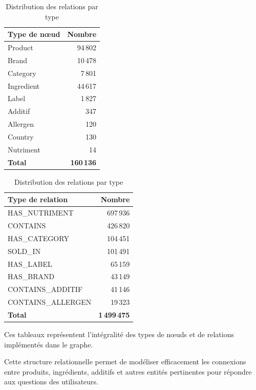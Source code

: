 \documentclass[a4paper,11pt]{article}
\begin{document}
\begin{table}[H]
\begin{minipage}[b]{0.45\linewidth}
\centering
\begin{tabular}{lr}
\toprule
\textbf{Type de nœud} & \textbf{Nombre} \\
\midrule
Product & 94\,802 \\
Brand & 10\,478 \\
Category & 7\,801 \\
Ingredient & 44\,617 \\
Label & 1\,827 \\
Additif & 347 \\
Allergen & 120 \\
Country & 130 \\
Nutriment & 14 \\
\midrule
\textbf{Total} & \textbf{160\,136} \\
\bottomrule
\end{tabular}
\caption{Distribution des nœuds par type}
\label{tab:node-types}
\end{minipage}
\hfill
\begin{minipage}[b]{0.5\linewidth}
\centering
\begin{tabular}{lr}
\toprule
\textbf{Type de relation} & \textbf{Nombre} \\
\midrule
HAS\_NUTRIMENT & 697\,936 \\
CONTAINS & 426\,820 \\
HAS\_CATEGORY & 104\,451 \\
SOLD\_IN & 101\,491 \\
HAS\_LABEL & 65\,159 \\
HAS\_BRAND & 43\,149 \\
CONTAINS\_ADDITIF & 41\,146 \\
CONTAINS\_ALLERGEN & 19\,323 \\
\midrule
\textbf{Total} & \textbf{1\,499\,475} \\
\bottomrule
\end{tabular}
\caption{Distribution des relations par type}
\label{tab:edge-types}
\end{minipage}
\end{table}

Ces tableaux représentent l'intégralité des types de nœuds et de relations implémentés dans le graphe.

Cette structure relationnelle permet de modéliser efficacement les connexions entre produits, ingrédients, additifs et autres entités pertinentes pour répondre aux questions des utilisateurs.
\end{document}
